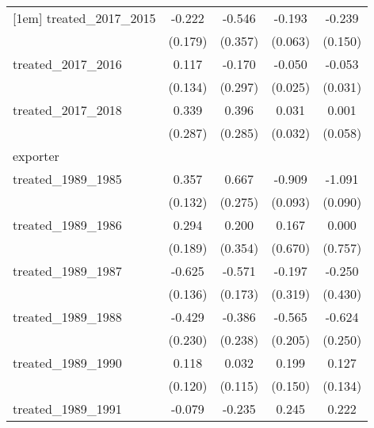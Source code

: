 {\begin{tabular}{l*{4}{c}}
[1em]
treated\_2017\_2015&      -0.222         &      -0.546         &      -0.193\sym{**} &      -0.239         \\
            &     (0.179)         &     (0.357)         &     (0.063)         &     (0.150)         \\
[1em]
treated\_2017\_2016&       0.117         &      -0.170         &      -0.050\sym{*}  &      -0.053         \\
            &     (0.134)         &     (0.297)         &     (0.025)         &     (0.031)         \\
[1em]
treated\_2017\_2018&       0.339         &       0.396         &       0.031         &       0.001         \\
            &     (0.287)         &     (0.285)         &     (0.032)         &     (0.058)         \\
\hline
exporter    &                     &                     &                     &                     \\
treated\_1989\_1985&       0.357\sym{**} &       0.667\sym{*}  &      -0.909\sym{***}&      -1.091\sym{***}\\
            &     (0.132)         &     (0.275)         &     (0.093)         &     (0.090)         \\
[1em]
treated\_1989\_1986&       0.294         &       0.200         &       0.167         &       0.000         \\
            &     (0.189)         &     (0.354)         &     (0.670)         &     (0.757)         \\
[1em]
treated\_1989\_1987&      -0.625\sym{***}&      -0.571\sym{***}&      -0.197         &      -0.250         \\
            &     (0.136)         &     (0.173)         &     (0.319)         &     (0.430)         \\
[1em]
treated\_1989\_1988&      -0.429         &      -0.386         &      -0.565\sym{**} &      -0.624\sym{*}  \\
            &     (0.230)         &     (0.238)         &     (0.205)         &     (0.250)         \\
[1em]
treated\_1989\_1990&       0.118         &       0.032         &       0.199         &       0.127         \\
            &     (0.120)         &     (0.115)         &     (0.150)         &     (0.134)         \\
[1em]
treated\_1989\_1991&      -0.079         &      -0.235         &       0.245         &       0.222         \\

\end{tabular}}
